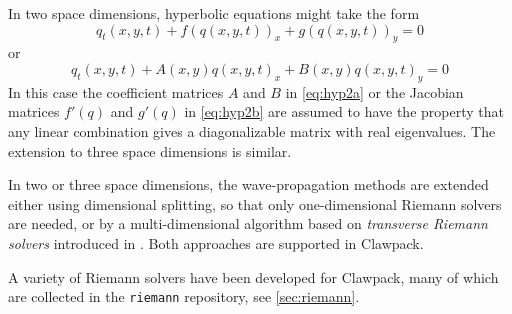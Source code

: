 In two space dimensions, hyperbolic equations might take the form
\begin{equation}\label{eq:hyp2a}
q_t(x,y,t) + f(q(x,y,t))_x + g(q(x,y,t))_y = 0
\end{equation}
or
\begin{equation}\label{eq:hyp2b}
q_t(x,y,t) + A(x,y)q(x,y,t)_x + B(x,y)q(x,y,t)_y = 0
\end{equation} 
In this case the
coefficient matrices $A$ and $B$ in \cref{eq:hyp2a} or the Jacobian matrices
$f'(q)$ and $g'(q)$ in \cref{eq:hyp2b} are assumed to have the property that any
linear combination gives a diagonalizable matrix with real eigenvalues.
The extension to three space dimensions is similar.

In two or three space dimensions, the wave-propagation methods
are extended either using dimensional splitting, so that only
one-dimensional Riemann solvers are needed, or by a multi-dimensional
algorithm based on {\em transverse Riemann solvers} introduced in 
\cite{rjl:wpalg}.  Both approaches are supported in Clawpack.

A variety of Riemann solvers have been developed for Clawpack, many of which
are collected in the \texttt{riemann} repository, see \cref{sec:riemann}.

